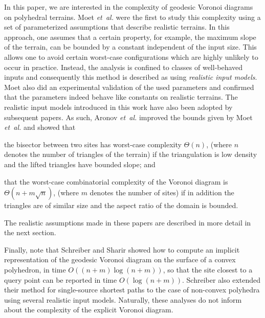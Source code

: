 \documentclass[12pt]{article}
\newcommand{\etal}{\textit{et~al.}\xspace}
\begin{document}
In this paper, we are interested in the complexity of geodesic Voronoi
diagrams on polyhedral terrains.  Moet \etal \cite{mks-ort-08} were
the first to study this complexity using a set of parameterized
assumptions that describe realistic terrains. In this approach, one
assumes that a certain property, for example, the maximum slope of the
terrain, can be bounded by a constant independent of the input size.
This allows one to avoid certain worst-case configurations which are
highly unlikely to occur in practice.  Instead, the analysis is
confined to classes of well-behaved inputs and consequently this
method is described as using \emph{realistic input models}.  Moet also
did an experimental validation of the used parameters
\cite{m-ccvge-08} and confirmed that the parameters indeed behave like
constants on realistic terrains.  The realistic input models
introduced in this work have also been adopted by subsequent papers.
As such, Aronov \etal \cite{abt-cbvdrt-08} improved the bounds given
by Moet \etal and showed that
\begin{inparaenum}[(i)]
    \item the bisector between two sites has worst-case complexity
    $\Theta(n)$, (where $n$ denotes the number of triangles of the
    terrain) if the triangulation is low density and the lifted
    triangles have bounded slope; and
    \item that the worst-case combinatorial complexity of the Voronoi
    diagram is $\Theta(n+m\sqrt{n})$, (where $m$ denotes the number of
    sites) if in addition the triangles are of similar size and the
    aspect ratio of the domain is bounded.
\end{inparaenum}
The realistic assumptions made in these papers are described in more
detail in the next section.

Finally, note that Schreiber and Sharir \cite{ss-spcp-08} showed how
to compute an implicit representation of the geodesic Voronoi diagram
on the surface of a convex polyhedron, in time $O((n+m)\log (n+m))$,
so that the site closest to a query point can be reported in time
$O(\log (n+m))$. Schreiber \cite{s-sprp-07} also extended their method
for single-source shortest paths to the case of non-convex polyhedra
using several realistic input models.  Naturally, these analyses do
not inform about the complexity of the explicit Voronoi diagram.
\end{document}
